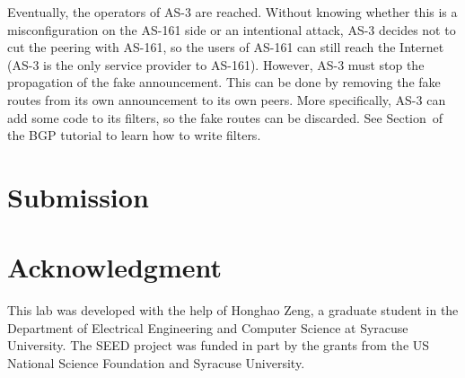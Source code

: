Eventually, the operators of AS-3 are reached. Without knowing 
whether this is a misconfiguration on the AS-161 side or an intentional
attack, AS-3 decides not to cut the peering with AS-161, so the users 
of AS-161 can still reach the Internet (AS-3 is the only service 
provider to AS-161). However, AS-3 must stop the propagation of the 
fake announcement. This can be done by removing the 
fake routes from its own announcement to its own peers.
More specifically, AS-3 can add some code to its 
filters, so the fake routes can be discarded. 
See Section~\bgphijacking of the BGP tutorial to learn how to write
filters. 


\section{Submission}





\section*{Acknowledgment} 

This lab was developed with the help of Honghao Zeng, 
a graduate student in the Department of Electrical Engineering 
and Computer Science at Syracuse University. 
The SEED project was funded in part 
by the grants from the US National Science Foundation
and Syracuse University.







